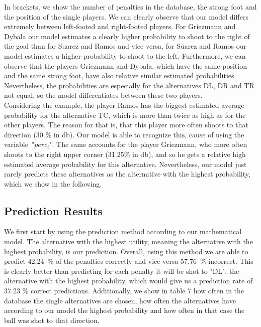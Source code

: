 \documentclass[12pt,dvipsnames]{article}%
\begin{document}
\vspace{+0.1cm}

In brackets, we show the number of penalties in the database, the strong foot and the position of the single players. We can clearly observe that our model differs extremely between left-footed and right-footed players. For Griezmann and Dybala our model estimates a clearly higher probability to shoot to the right of the goal than for Suarez and Ramos and vice versa, for Suarez and Ramos our model estimates a higher probability to shoot to the left. Furthermore, we can observe that the players Griezmann and Dybala, which have the same position and the same strong foot, have also relative similar estimated probabilities. Nevertheless, the probabilities are especially for the alternatives DL, DR and TR not equal, so the model differentiates between these two players.\\
Considering the example, the player Ramos has the biggest estimated average probability for the alternative TC, which is more than twice as high as for the other players. The reason for that is, that this player more often shoots to that direction (30 \% in db). Our model is able to recognize this, cause of using the \mbox{variable "$perc_i$"}. The same accounts for the player Griezmann, who more often shoots to the right upper corner (31.25\% in db), and so he gets a relative high estimated average probability for this alternative. Nevertheless, our model just rarely predicts these alternatives as the alternative with the highest probability, which we show in the following. 

\subsection{Prediction Results} 

We first start by using the prediction method according to our mathematical model. The alternative with the highest utility, meaning the alternative with the highest probability, is our prediction. Overall, using this method we are able to predict \mbox{42.24 \%} of the penalties correctly and vice versa \mbox{57.76 \%} incorrect. This is clearly better than predicting for each penalty it will be shot to "DL", the alternative with the highest probability, which would give us a prediction rate of 37.23 \% correct predictions. Additionally, we show in table 7 how often in the database the single alternatives are chosen, how often the alternatives have according to our model the highest probability and how often in that case the ball was shot to that direction. 
\end{document}
